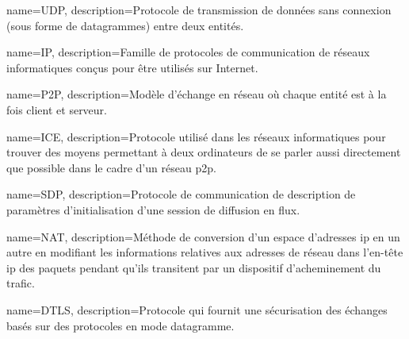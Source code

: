 

{
  name=UDP,
  description={Protocole de transmission de données sans connexion (sous forme de datagrammes) entre deux entités.}
}

{
  name=IP,
  description={Famille de protocoles de communication de réseaux informatiques conçus pour être utilisés sur Internet.}
}

{
  name=P2P,
  description={Modèle d'échange en réseau où chaque entité est à la fois client et serveur.}
}

{
  name=ICE,
  description={Protocole utilisé dans les réseaux informatiques pour trouver des moyens permettant à deux ordinateurs de se parler aussi directement que possible dans le cadre d'un réseau \gls{p2p}.}
}

{
  name=SDP,
  description={Protocole de communication de description de paramètres d'initialisation d'une session de diffusion en flux.}
}

{
  name=NAT,
  description={Méthode de conversion d'un espace d'adresses \gls{ip} en un autre en modifiant les informations relatives aux adresses de réseau dans l'en-tête \gls{ip} des paquets pendant qu'ils transitent par un dispositif d'acheminement du trafic.}
}

{
  name=DTLS,
  description={Protocole qui fournit une sécurisation des échanges basés sur des protocoles en mode datagramme.}
}

